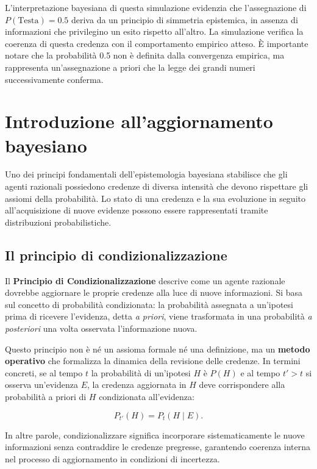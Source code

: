 \documentclass[
  letterpaper,
  DIV=11,
  numbers=noendperiod,
  oneside]{scrreprt}
\theoremstyle{definition}
\theoremstyle{plain}
\theoremstyle{definition}
\theoremstyle{remark}
\begin{document}
L'interpretazione bayesiana di questa simulazione evidenzia che
l'assegnazione di \(P(\text{Testa}) = 0.5\) deriva da un principio di
simmetria epistemica, in assenza di informazioni che privilegino un
esito rispetto all'altro. La simulazione verifica la coerenza di questa
credenza con il comportamento empirico atteso. È importante notare che
la probabilità 0.5 non è definita dalla convergenza empirica, ma
rappresenta un'assegnazione a priori che la legge dei grandi numeri
successivamente conferma.

\section{Introduzione all'aggiornamento
bayesiano}\label{introduzione-allaggiornamento-bayesiano}

Uno dei principi fondamentali dell'epistemologia bayesiana stabilisce
che gli agenti razionali possiedono credenze di diversa intensità che
devono rispettare gli assiomi della probabilità. Lo stato di una
credenza e la sua evoluzione in seguito all'acquisizione di nuove
evidenze possono essere rappresentati tramite distribuzioni
probabilistiche.

\subsection{Il principio di
condizionalizzazione}\label{il-principio-di-condizionalizzazione}

Il \textbf{Principio di Condizionalizzazione} descrive come un agente
razionale dovrebbe aggiornare le proprie credenze alla luce di nuove
informazioni. Si basa sul concetto di probabilità condizionata: la
probabilità assegnata a un'ipotesi prima di ricevere l'evidenza, detta
\emph{a priori}, viene trasformata in una probabilità \emph{a
posteriori} una volta osservata l'informazione nuova.

Questo principio non è né un assioma formale né una definizione, ma un
\textbf{metodo operativo} che formalizza la dinamica della revisione
delle credenze. In termini concreti, se al tempo \(t\) la probabilità di
un'ipotesi \(H\) è \(P(H)\) e al tempo \(t' > t\) si osserva un'evidenza
\(E\), la credenza aggiornata in \(H\) deve corrispondere alla
probabilità a priori di \(H\) condizionata all'evidenza:

\[
P_{t'}(H) = P_t(H \mid E).
\]

In altre parole, condizionalizzare significa incorporare
sistematicamente le nuove informazioni senza contraddire le credenze
pregresse, garantendo coerenza interna nel processo di aggiornamento in
condizioni di incertezza.
\end{document}
